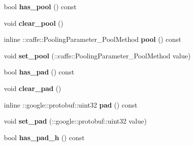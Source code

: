 \begin{DoxyCompactItemize}
\item 
\mbox{\label{classcaffe_1_1_pooling_parameter_afdf5a64ddca87a11809f2a8d318a802b}} 
bool {\bfseries has\+\_\+pool} () const
\item 
\mbox{\label{classcaffe_1_1_pooling_parameter_a7d2f175982c27116179ca86fa4c7649f}} 
void {\bfseries clear\+\_\+pool} ()
\item 
\mbox{\label{classcaffe_1_1_pooling_parameter_a89ebbdb1daa416adf5b4ffa70d306576}} 
inline \+::caffe\+::\+Pooling\+Parameter\+\_\+\+Pool\+Method {\bfseries pool} () const
\item 
\mbox{\label{classcaffe_1_1_pooling_parameter_a24358a91de5d15f45566c74e20416865}} 
void {\bfseries set\+\_\+pool} (\+::caffe\+::\+Pooling\+Parameter\+\_\+\+Pool\+Method value)
\item 
\mbox{\label{classcaffe_1_1_pooling_parameter_a2f2abe08edf022f35e2638a845be03c9}} 
bool {\bfseries has\+\_\+pad} () const
\item 
\mbox{\label{classcaffe_1_1_pooling_parameter_aa6ff174d344b3cad12e630d1fd313318}} 
void {\bfseries clear\+\_\+pad} ()
\item 
\mbox{\label{classcaffe_1_1_pooling_parameter_a3356c46c47d60b49a9e5c5826a8cc077}} 
inline \+::google\+::protobuf\+::uint32 {\bfseries pad} () const
\item 
\mbox{\label{classcaffe_1_1_pooling_parameter_a4718852125664cd698d0380947602b60}} 
void {\bfseries set\+\_\+pad} (\+::google\+::protobuf\+::uint32 value)
\item 
\mbox{\label{classcaffe_1_1_pooling_parameter_a5cc1328ed8c527242b9f2123f6f06cc5}} 
bool {\bfseries has\+\_\+pad\+\_\+h} () const
\item 
\mbox{\label{classcaffe_1_1_pooling_parameter_a6eaaf69fef53264622e7ce224d58222a}} 

\end{DoxyCompactItemize}
